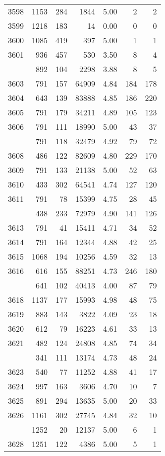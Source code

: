 \documentclass[
]{article}
\begin{document}
\begin{table}
\begin{tabular}[t]{lrrrrrr}
3598 & 1153 & 284 & 1844 & 5.00 & 2 & 2\\
3599 & 1218 & 183 & 14 & 0.00 & 0 & 0\\
3600 & 1085 & 419 & 397 & 5.00 & 1 & 1\\
3601 & 936 & 457 & 530 & 3.50 & 8 & 4\\
\addlinespace
3602 & 892 & 104 & 2298 & 3.88 & 8 & 5\\
3603 & 791 & 157 & 64909 & 4.84 & 184 & 178\\
3604 & 643 & 139 & 83888 & 4.85 & 186 & 220\\
3605 & 791 & 179 & 34211 & 4.89 & 105 & 123\\
3606 & 791 & 111 & 18990 & 5.00 & 43 & 37\\
\addlinespace
3607 & 791 & 118 & 32479 & 4.92 & 79 & 72\\
3608 & 486 & 122 & 82609 & 4.80 & 229 & 170\\
3609 & 791 & 133 & 21138 & 5.00 & 52 & 63\\
3610 & 433 & 302 & 64541 & 4.74 & 127 & 120\\
3611 & 791 & 78 & 15399 & 4.75 & 28 & 45\\
\addlinespace
3612 & 438 & 233 & 72979 & 4.90 & 141 & 126\\
3613 & 791 & 41 & 15411 & 4.71 & 34 & 52\\
3614 & 791 & 164 & 12344 & 4.88 & 42 & 25\\
3615 & 1068 & 194 & 10256 & 4.59 & 32 & 13\\
3616 & 616 & 155 & 88251 & 4.73 & 246 & 180\\
\addlinespace
3617 & 641 & 102 & 40413 & 4.00 & 87 & 79\\
3618 & 1137 & 177 & 15993 & 4.98 & 48 & 75\\
3619 & 883 & 143 & 3822 & 4.09 & 23 & 18\\
3620 & 612 & 79 & 16223 & 4.61 & 33 & 13\\
3621 & 482 & 124 & 24808 & 4.85 & 74 & 34\\
\addlinespace
3622 & 341 & 111 & 13174 & 4.73 & 48 & 24\\
3623 & 540 & 77 & 11252 & 4.88 & 41 & 17\\
3624 & 997 & 163 & 3606 & 4.70 & 10 & 7\\
3625 & 891 & 294 & 13635 & 5.00 & 20 & 33\\
3626 & 1161 & 302 & 27745 & 4.84 & 32 & 10\\
\addlinespace
3627 & 1252 & 20 & 12137 & 5.00 & 6 & 1\\
3628 & 1251 & 122 & 4386 & 5.00 & 5 & 1\\

\end{tabular}
\end{table}
\end{document}
